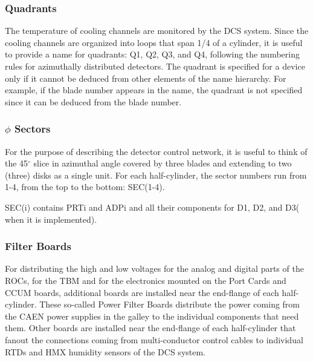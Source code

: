 \documentclass{cmspaper}
\begin{document}
\subsubsection{Quadrants}

The temperature of cooling channels are monitored by the DCS system. 
Since the cooling channels are organized into loops that span 1/4 of a cylinder, 
it is useful to provide a name for quadrants: Q1, Q2, Q3, and Q4, following 
the numbering rules for azimuthally distributed detectors. The quadrant is 
specified for a device only if it cannot be deduced from other elements of 
the name hierarchy. For example, if the blade number appears in the name, the 
quadrant is not specified since it can be deduced from the blade number.

\subsubsection{$\phi$ Sectors}

For the purpose of describing the detector control network,
it is useful to think of the 45$^{\circ}$ slice in azimuthal angle covered by three blades and extending to two (three) disks as a single unit.  For each 
half-cylinder, the sector numbers run from 1-4, from the top to the bottom:
SEC(1-4).

SEC(i) contains PRTi and ADPi and all their components for D1, D2, and D3( when
it is implemented).


\subsubsection{Filter Boards}

For distributing the high and low voltages for the analog and digital parts of the ROCs,
for the TBM and for the electronics mounted on the Port Cards and CCUM boards,
additional boards are installed near the end-flange of each half-cylinder.
These so-called Power Filter Boards distribute the power coming from the CAEN power supplies
in the galley to the individual components that need them.
Other boards are installed near the end-flange of each half-cylinder that fanout
the connections coming from multi-conductor control cables to individual RTDs 
and HMX humidity sensors of the DCS system.
\end{document}
